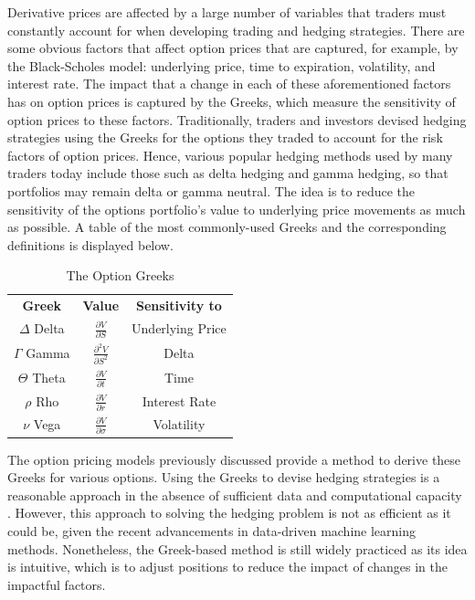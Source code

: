 Derivative prices are affected by a large number of variables that traders must constantly account for when developing trading and hedging strategies. There are some obvious factors that affect option prices that are captured, for example, by the Black-Scholes model: underlying price, time to expiration, volatility, and interest rate. The impact that a change in each of these aforementioned factors has on option prices is captured by the Greeks, which measure the sensitivity of option prices to these factors. Traditionally, traders and investors devised hedging strategies using the Greeks for the options they traded to account for the risk factors of option prices. Hence, various popular hedging methods used by many traders today include those such as delta hedging and gamma hedging, so that portfolios may remain delta or gamma neutral. The idea is to reduce the sensitivity of the options portfolio's value to underlying price movements as much as possible. A table of the most commonly-used Greeks and the corresponding definitions is displayed below.
\begin{table}[h]
\begin{center}
\begin{tabular}{c|c|c} 
\textbf{Greek} & \textbf{Value} & \textbf{Sensitivity to}\\[5pt]
$\Delta$ Delta & $\frac{\partial{V}}{\partial{S}}$ & Underlying Price\\[5pt]
$\Gamma$ Gamma & $\frac{\partial^2{V}}{\partial{S}^2}$ & Delta\\[5pt]
$\Theta$ Theta & $\frac{\partial{V}}{\partial{t}}$ & Time\\[5pt]
$\rho$ Rho & $\frac{\partial{V}}{\partial{r}}$ & Interest Rate\\[5pt]
$\nu$ Vega & $\frac{\partial{V}}{\partial{\sigma}}$ & Volatility\\[5pt]
\end{tabular}
\caption{The Option Greeks}
\end{center}
\end{table}

\noindent The option pricing models previously discussed provide a method to derive these Greeks for various options. Using the Greeks to devise hedging strategies is a reasonable approach in the absence of sufficient data and computational capacity \cite{deep-hedging-ppt}. However, this approach to solving the hedging problem is not as efficient as it could be, given the recent advancements in data-driven machine learning methods. Nonetheless, the Greek-based method is still widely practiced as its idea is intuitive, which is to adjust positions to reduce the impact of changes in the impactful factors.

